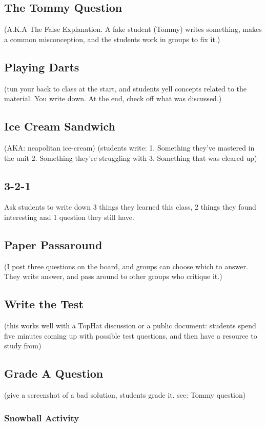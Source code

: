 \subsection*{The Tommy Question}
(A.K.A The False Explanation. A fake student (Tommy) writes something,
makes a common misconception, and the students work in groups 
to fix it.)
\subsection*{Playing Darts}
(tun your back to class at the start, and students yell concepts 
related to the material. You write down. At the end, check off what was 
discussed.)
\subsection*{Ice Cream Sandwich}
(AKA: neapolitan ice-cream)
(students write:
1. Something they've mastered in the unit
2. Something they're struggling with
3. Something that was cleared up)
\subsection*{3-2-1}
Ask students to write down 3 things they learned this class, 2 things they found interesting and 1 question they still have.
\subsection*{Paper Passaround}
(I post three questions on the board, 
and groups can choose which to answer. They write answer, and pass 
around to other groups who critique it.)
\subsection*{Write the Test}
(this works well with a TopHat discussion or a public document: 
students spend five minutes coming up with possible test questions, 
and then have a resource to study from)
\subsection*{Grade A Question}
(give a screenshot of a bad solution, students grade it. 
see: Tommy question)
\subsubsection{Snowball Activity}

